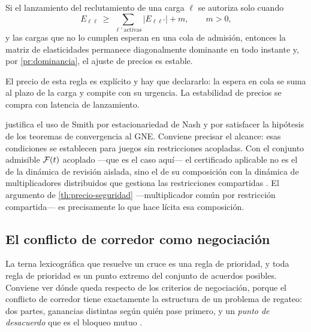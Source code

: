 \begin{corolario}
\label{co:admision}
Si el lanzamiento del reclutamiento de una carga $\ell$ se autoriza solo cuando
\[
  E_{\ell\ell}\ \ge\ \sum_{\ell'\ \mathrm{activas}}\bigl|E_{\ell\ell'}\bigr|+m,
  \qquad m>0,
\]
y las cargas que no lo cumplen esperan en una cola de admisión, entonces la
matriz de elasticidades permanece diagonalmente dominante en todo instante y,
por \cref{pr:dominancia}, el ajuste de precios es estable.
\end{corolario}

El precio de esta regla es explícito y hay que declararlo: la espera en cola se
suma al plazo de la carga y compite con su urgencia. La estabilidad de precios
se compra con latencia de lanzamiento.

\begin{observacion}
\label{obs:smith-acoplado}
 justifica el uso de Smith por estacionariedad de Nash y por
satisfacer la hipótesis de los teoremas de convergencia al GNE. Conviene
precisar el alcance: esas condiciones se establecen para juegos sin
restricciones acopladas. Con el conjunto admisible $\mathcal{F}(t)$ acoplado —que es
el caso aquí— el certificado aplicable no es el de la dinámica de revisión
aislada, sino el de su composición con la dinámica de multiplicadores
distribuidos que gestiona las restricciones compartidas
\cite{martinezPiazuelo2025gne}. El argumento de \cref{th:precio-seguridad}
—multiplicador común por restricción compartida— es precisamente lo que hace
lícita esa composición.
\end{observacion}

\subsection{El conflicto de corredor como negociación}

La terna lexicográfica que resuelve un cruce es una regla de prioridad, y toda
regla de prioridad es un punto extremo del conjunto de acuerdos posibles.
Conviene ver dónde queda respecto de los criterios de negociación, porque el
conflicto de corredor tiene exactamente la estructura de un problema de regateo:
dos partes, ganancias distintas según quién pase primero, y un \emph{punto de
desacuerdo} que es el bloqueo mutuo \cite{clempner2024optimization}.

